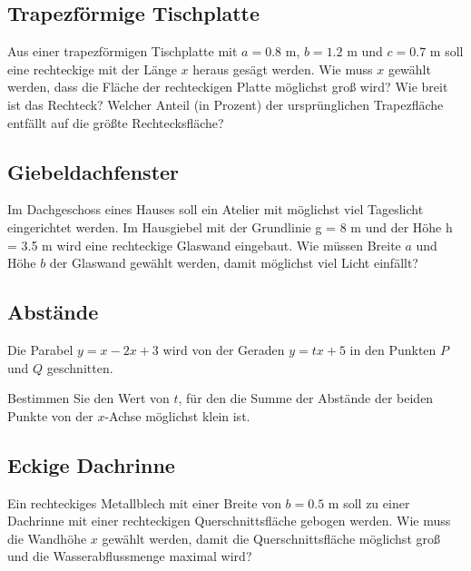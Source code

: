 \subsection{Trapezförmige Tischplatte}
Aus einer trapezförmigen Tischplatte mit
$a = 0.8 \text{ m}$, $b = 1.2 \text{ m}$ und $c = 0.7 \text{ m}$ soll eine
rechteckige mit der Länge $x$ heraus gesägt
werden. Wie muss $x$ gewählt werden, dass
die Fläche der rechteckigen Platte möglichst
groß wird? Wie breit ist das Rechteck? Welcher
Anteil (in Prozent) der ursprünglichen Trapezfläche entfällt auf die größte Rechtecksfläche?



\subsection{Giebeldachfenster}

Im Dachgeschoss eines Hauses soll ein Atelier
mit möglichst viel Tageslicht eingerichtet
werden. Im Hausgiebel mit der Grundlinie
g = 8 m und der Höhe h = 3.5 m wird eine
rechteckige Glaswand eingebaut. Wie müssen
Breite $a$ und Höhe $b$ der Glaswand gewählt
werden, damit möglichst viel Licht einfällt?




\subsection{Abstände}
Die Parabel $y = x - 2x + 3$ wird von der Geraden $y = tx + 5$ in den
Punkten $P$ und $Q$ geschnitten.

Bestimmen Sie den Wert von $t$, für den die Summe der Abstände der beiden Punkte
von der $x$-Achse möglichst klein ist.



\subsection{Eckige Dachrinne}
Ein rechteckiges Metallblech mit einer Breite
von $b = 0.5 \text{ m}$ soll zu einer Dachrinne mit einer
rechteckigen Querschnittsfläche gebogen werden.
Wie muss die Wandhöhe $x$ gewählt werden, damit
die Querschnittsfläche möglichst groß und die
Wasserabflussmenge maximal wird?

